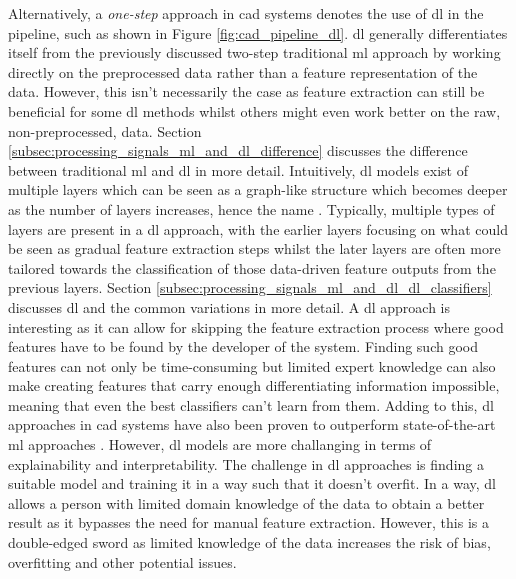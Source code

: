 Alternatively, a \textit{one-step} approach in \gls{cad} systems denotes the use of \gls{dl} in the pipeline, such as shown in Figure \ref{fig:cad_pipeline_dl}.
\gls{dl} generally differentiates itself from the previously discussed two-step traditional \gls{ml} approach by working directly on the preprocessed data rather than a feature representation of the data.
However, this isn't necessarily the case as feature extraction can still be beneficial for some \gls{dl} methods whilst others might even work better on the raw, non-preprocessed, data.
Section \ref{subsec:processing_signals_ml_and_dl_difference} discusses the difference between traditional \gls{ml} and \gls{dl} in more detail.
Intuitively, \gls{dl} models exist of multiple layers which can be seen as a graph-like structure which becomes deeper as the number of layers increases, hence the name .
Typically, multiple types of layers are present in a \gls{dl} approach, with the earlier layers focusing on what could be seen as gradual feature extraction steps whilst the later layers are often more tailored towards the classification of those data-driven feature outputs from the previous layers.
Section \ref{subsec:processing_signals_ml_and_dl_dl_classifiers} discusses \gls{dl} and the common variations in more detail.
A \gls{dl} approach is interesting as it can allow for skipping the feature extraction process where good features have to be found by the developer of the system.
Finding such good features can not only be time-consuming but limited expert knowledge can also make creating features that carry enough differentiating information impossible, meaning that even the best classifiers can't learn from them.
Adding to this, \gls{dl} approaches in \gls{cad} systems have also been proven to outperform state-of-the-art \gls{ml} approaches \citep{CAD_ml_dl_kbs}.
However, \gls{dl} models are more challanging in terms of explainability and interpretability.
The challenge in \gls{dl} approaches is finding a suitable model and training it in a way such that it doesn't overfit.
In a way, \gls{dl} allows a person with limited domain knowledge of the data to obtain a better result as it bypasses the need for manual feature extraction.
However, this is a double-edged sword as limited knowledge of the data increases the risk of bias, overfitting and other potential issues.

